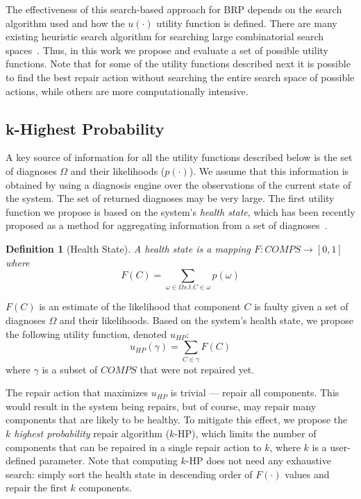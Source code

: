 \documentclass[review]{elsarticle}
\newtheorem{definition}{Definition}
\begin{document}
The effectiveness of this search-based approach for BRP depends on the search algorithm used and how the $u(\cdot)$ utility function is defined.
There are many existing heuristic search algorithm for searching large combinatorial search spaces~\cite{russell2010artificialIntelligence,edelkamp2011heuristic}. Thus, in this work we propose and evaluate a set of possible utility functions. Note that for some of the utility functions described next it is possible to find the best repair action without searching the entire search space of possible actions, while others are more computationally intensive.


\subsection{k-Highest Probability}

A key source of information for all the utility functions described below is the set of diagnoses $\Omega$ and their likelihoods ($p(\cdot)$). We assume that this information is obtained by using a diagnosis engine over the observations of the current state of the system. The set of returned diagnoses may be very large. The first utility function we propose is based on the system's {\em health state}, which has been recently proposed as a method for aggregating information from a set of diagnoses~\cite{Stern15shely}.

\begin{definition}[Health State]
A health state is a mapping $F: COMPS\rightarrow [0,1]$ where
\[ \displaystyle F(C)=\sum_{\omega\in \Omega s.t. C\in \omega} p(\omega)\]
\label{def:health-state}
\end{definition}
$F(C)$ is an estimate of the likelihood that component $C$ is faulty given a set of diagnoses $\Omega$ and their likelihoods.
Based on the system's health state, we propose the following utility function, denoted $u_{HP}$:
\[
u_{HP}(\gamma) = \sum_{C\in \gamma} F(C)
\]
where $\gamma$ is a subset of $COMPS$ that were not repaired yet.


The repair action that maximizes $u_{HP}$ is trivial --- repair all components.
This would result in the system being repairs, but of course, may repair many components that are likely to be healthy. To mitigate this effect, we propose the {\em $k$ highest probability} repair algorithm ($k$-HP), which limits the number of components that can be repaired in a single repair action to $k$, where $k$ is a user-defined parameter. Note that computing $k$-HP does not need any exhaustive search: simply sort the health state in descending order of $F(\cdot)$ values and repair the first $k$ components.
\end{document}

